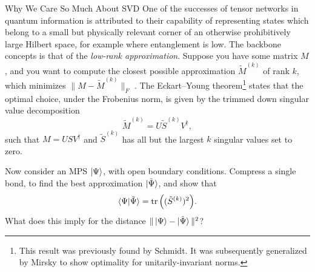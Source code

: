 \documentclass[a4paper,10pt,twoside]{article}
\DeclareMathOperator{\trace}{tr}
\begin{document}
\begin{section}{Why We Care So Much About SVD}
One of the successes of tensor networks in quantum information is attributed to their capability of representing states which belong to a small but physically relevant corner of an otherwise prohibitively large Hilbert space, for example where entanglement is low.
The backbone concepts is that of the \emph{low-rank approximation}.
Suppose you have some matrix $M$, and you want to compute the closest possible approximation $\tilde{M}^{(k)}$ of rank $k$, which minimizes $\|M -\tilde{M}^{(k)}\|_F$ . 
The Eckart--Young theorem\footnote{This result was previously found by Schmidt. It was subsequently generalized by Mirsky to show optimality for unitarily-invariant norms.} states that the optimal choice, under the Frobenius norm, is given by the trimmed down singular value decomposition 
\[
  \tilde{M}^{(k)} = U\tilde{S}^{(k)} V^\dag,
\]
such that $M = USV^\dag$ and $\tilde{S}^{(k)}$ has all but the largest $k$ singular values set to zero.

Now consider an MPS $\ket{\Psi}$, with open boundary conditions.
Compress a single bond, to find the best approximation $\ket{\tilde{\Psi}}$, and show that 
\[
  \braket{\Psi|\tilde{\Psi}} = \trace{\left((\tilde{S}^{(k)})^2\right)}.
\]
What does this imply for the distance $\|\ket{\Psi} - \ket{\tilde{\Psi}} \|^2$?
\end{section}
\end{document}

